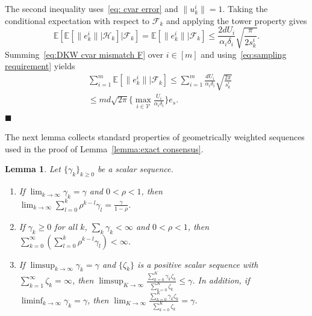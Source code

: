 \documentclass[twocolumn]{autart}    %
\newcommand{\brk}[1]{\left[#1\right]}
\newtheorem{lemma}{Lemma}
\newcommand{\1}{\mathbf{1}}
\begin{document}
The second inequality uses~\eqref{eq: cvar error} and $\|u_k^i\|=1$. Taking the conditional expectation with respect to $\mathcal F_k$ and applying the tower property gives
\begin{equation}\label{eq:DKW cvar mismatch F}
\mathbb{E}\brk{\mathbb{E}\brk{\|e_k^i\| | \mathcal{H}_k } | \mathcal{F}_k} =  \mathbb{E}\brk{\|e_k^i\| | \mathcal{F}_k}  \le  \frac{ 2dU_i}{\alpha_i\delta_i}  \sqrt{\frac{\pi}{2s_k^i}}.
\end{equation}
Summing~\eqref{eq:DKW cvar mismatch F} over $i\in[m]$ and using~\eqref{eq:sampling requirement} yields
\begin{align*}
&\sum_{i=1}^m  \mathbb{E}\brk{       \|e_k^i\| \big| \mathcal{F}_k }   
   \le  \sum_{i=1}^m\frac{  dU_i}{\alpha_i\delta_i} \sqrt{\frac{2\pi}{s_k^i}} \nonumber \\
&  \le    md\sqrt{2 \pi  }\Big\{\max_{i\in \mathcal{V}} \frac{U_i}{\alpha_i\delta_i}\Big\} e_s   .
\end{align*}
\hfill $\blacksquare$

The next lemma collects standard properties of geometrically weighted sequences used in the proof of Lemma~\ref{lemma:exact consensus}.
\begin{lemma}\cite[Lemma 3.1]{nedic2008distributed}\label{lemma:accumulative sequence}
    Let $\{\gamma_k\}_{k\ge0}$ be a scalar sequence.
\begin{enumerate}
    \item  If $\lim_{k \to \infty} \gamma_k = \gamma$ and $0 < \rho < 1$, then \\$\lim_{k \to \infty} \sum_{l=0}^k \rho^{k-l} \gamma_l = \frac{\gamma}{1-\rho}$.
    
    \item If $\gamma_k \geq 0$ for all $k$, $\sum_k \gamma_k < \infty$ and $0 < \rho < 1$, then $\sum_{k=0}^\infty \left( \sum_{l=0}^k \rho^{k-l} \gamma_l \right) < \infty$.
    
    \item  If $\limsup_{k \to \infty} \gamma_k = \gamma$ and $\{\zeta_k\}$ is a positive scalar sequence with $\sum_{k=1}^\infty \zeta_k = \infty$, then $\limsup_{K \to \infty} \frac{\sum_{k=0}^K \gamma_k \zeta_k}{\sum_{k=0}^K \zeta_k} \leq \gamma$. In addition, if $\liminf_{k \to \infty} \gamma_k = \gamma$, then $\lim_{K \to \infty} \frac{\sum_{k=0}^K \gamma_k \zeta_k}{\sum_{k=0}^K \zeta_k} = \gamma$.
\end{enumerate}
\end{lemma}
\end{document}
